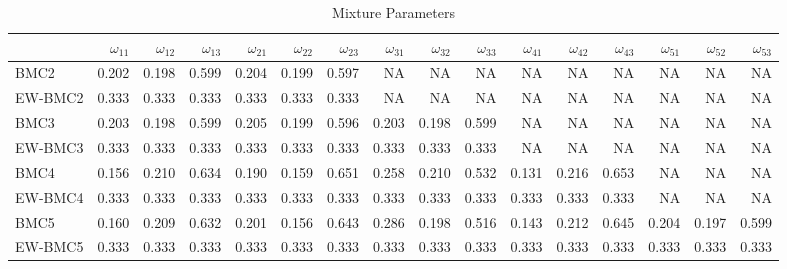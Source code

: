 \documentclass[
]{article}
\begin{document}
\begin{table}[H]

\caption{\label{tab:unnamed-chunk-12}Mixture Parameters}
\centering
\fontsize{8}{10}\selectfont
\begin{tabular}[t]{lrrrrrrrrrrrrrrr}
\toprule
  & $\omega_{11}$ & $\omega_{12}$ & $\omega_{13}$ & $\omega_{21}$ & $\omega_{22}$ & $\omega_{23}$ & $\omega_{31}$ & $\omega_{32}$ & $\omega_{33}$ & $\omega_{41}$ & $\omega_{42}$ & $\omega_{43}$ & $\omega_{51}$ & $\omega_{52}$ & $\omega_{53}$\\
\midrule
BMC2 & 0.202 & 0.198 & 0.599 & 0.204 & 0.199 & 0.597 & NA & NA & NA & NA & NA & NA & NA & NA & NA\\
EW-BMC2 & 0.333 & 0.333 & 0.333 & 0.333 & 0.333 & 0.333 & NA & NA & NA & NA & NA & NA & NA & NA & NA\\
BMC3 & 0.203 & 0.198 & 0.599 & 0.205 & 0.199 & 0.596 & 0.203 & 0.198 & 0.599 & NA & NA & NA & NA & NA & NA\\
EW-BMC3 & 0.333 & 0.333 & 0.333 & 0.333 & 0.333 & 0.333 & 0.333 & 0.333 & 0.333 & NA & NA & NA & NA & NA & NA\\
BMC4 & 0.156 & 0.210 & 0.634 & 0.190 & 0.159 & 0.651 & 0.258 & 0.210 & 0.532 & 0.131 & 0.216 & 0.653 & NA & NA & NA\\
\addlinespace
EW-BMC4 & 0.333 & 0.333 & 0.333 & 0.333 & 0.333 & 0.333 & 0.333 & 0.333 & 0.333 & 0.333 & 0.333 & 0.333 & NA & NA & NA\\
BMC5 & 0.160 & 0.209 & 0.632 & 0.201 & 0.156 & 0.643 & 0.286 & 0.198 & 0.516 & 0.143 & 0.212 & 0.645 & 0.204 & 0.197 & 0.599\\
EW-BMC5 & 0.333 & 0.333 & 0.333 & 0.333 & 0.333 & 0.333 & 0.333 & 0.333 & 0.333 & 0.333 & 0.333 & 0.333 & 0.333 & 0.333 & 0.333\\
\bottomrule
\end{tabular}
\end{table}
\end{document}
